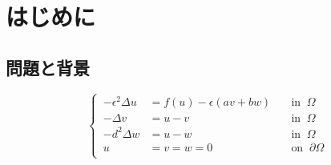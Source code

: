 \chapter{はじめに}\label{Introduction}

\section{問題と背景}
\begin{equation}\label{eq:問題}
  \left\{ \,
      \begin{aligned}
          -{\epsilon}^2\Delta u &= f(u)-\epsilon (a v + b w) \quad &\text{in}\;\;\Omega\\
          -\Delta v &=u-v \quad &\text{in} \;\;\Omega\\
          -d^2\Delta w &=u-w \quad &\text{in} \;\;\Omega\\
          u &= v = w =0 \quad &\text{on}\;\;\partial\Omega\\
      \end{aligned}
  \right.
\end{equation}

